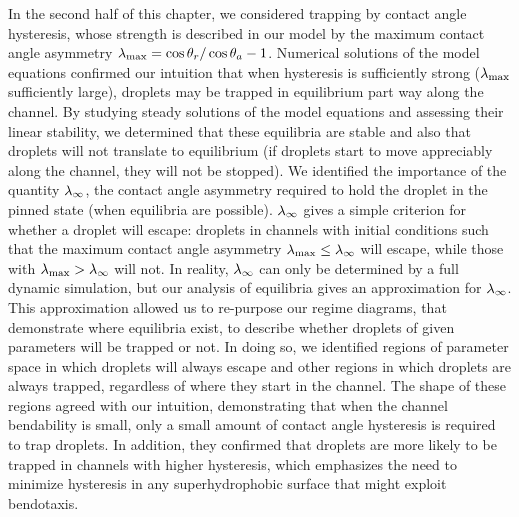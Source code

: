 In the second half of this chapter, we considered trapping by contact angle hysteresis, whose strength is described in our model by the maximum contact angle asymmetry $\lambda_{\text{max}} = \cos \theta_r / \cos \theta_a -1$. Numerical solutions of the model equations confirmed our intuition that when hysteresis is sufficiently strong ($\lambda_{\text{max}}$ sufficiently large), droplets may be trapped in equilibrium part way along the channel. By studying steady solutions of the model equations and assessing their linear stability, we determined that these equilibria are stable and also that droplets will not translate to equilibrium (if droplets start to move appreciably along the channel, they will not be stopped). We identified the importance of the quantity $\lambda_{\infty}$, the contact angle asymmetry required to hold the droplet in the pinned state (when equilibria are possible). $\lambda_{\infty}$ gives a simple criterion for whether a droplet will escape: droplets in channels with initial conditions such that the maximum contact angle asymmetry $\lambda_{\text{max}} \leq \lambda_{\infty}$ will escape, while those with $ \lambda_{\text{max}} > \lambda_{\infty}$ will not. In reality, $\lambda_{\infty}$ can only be determined by a full dynamic simulation, but our analysis of equilibria gives  an approximation for $\lambda_{\infty}$. This approximation allowed us to re-purpose our regime diagrams, that  demonstrate where equilibria exist, to describe whether droplets of given parameters will be trapped or not. In doing so, we identified regions of parameter space in which droplets will always escape and other regions in which droplets are always trapped, regardless of where they start in the channel.  The shape of these regions agreed with our intuition, demonstrating that when the channel bendability is small, only a small amount of contact angle hysteresis is required to trap droplets. In addition, they confirmed that droplets are more likely to be trapped in channels with higher hysteresis, which emphasizes the need to minimize hysteresis in any superhydrophobic surface that might exploit bendotaxis. 


